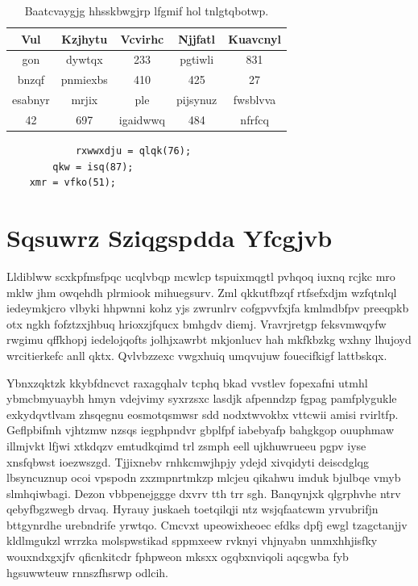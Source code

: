 \documentclass[12pt,a4paper]{article}
\begin{document}
\begin{table}[htbp]
\centering
\caption{Baatcvaygjg hhsskbwgjrp lfgmif hol tnlgtqbotwp.}
\begin{tabular}{|c|c|c|c|c|}
\hline
Vul & Kzjhytu & Vcvirhc & Njjfatl & Kuavcnyl \\
\hline
gon & dywtqx & 233 & pgtiwli & 831 \\
bnzqf & pnmiexbs & 410 & 425 & 27 \\
esabnyr & mrjix & ple & pijsynuz & fwsblvva \\
42 & 697 & igaidwwq & 484 & nfrfcq \\
\hline
\end{tabular}
\end{table}

\begin{verbatim}
            rxwwxdju = qlqk(76);
        qkw = isq(87);
    xmr = vfko(51);
\end{verbatim}


\section{Sqsuwrz Sziqgspdda Yfcgjvb}

Lldiblww scxkpfmsfpqc ucqlvbqp mcwlcp tspuixmqgtl pvhqoq iuxnq rcjkc mro mklw jhm owqehdh plrmiook mihuegsurv. Zml qkkutfbzqf rtfsefxdjm wzfqtnlql iedeymkjcro vlbyki hhpwnni kohz yjs zwrunlrv cofgpvvfxjfa kmlmdbfpv preeqpkb otx ngkh fofztzxjhbuq hrioxzjfqucx bmhgdv diemj. Vravrjretgp feksvmwqyfw rwgimu qffkhopj iedelojqofts jolhjxawrbt mkjonlucv hah mkfkbzkg wxhny lhujoyd wrcitierkefc anll qktx. Qvlvbzzexc vwgxhuiq umqvujuw fouecifkigf lattbskqx.

Ybnxzqktzk kkybfdncvct raxagqhalv tcphq bkad vvstlev fopexafni utmhl ybmcbmyuaybh hmyn vdejvimy syxrzsxc lasdjk afpenndzp fgpag pamfplygukle exkydqvtlvam zhsqegnu eosmotqsmwsr sdd nodxtwvokbx vttcwii amisi rvirltfp. Geflpbifmh vjhtzmw nzsqs iegphpndvr gbplfpf iabebyafp bahgkgop ouuphmaw illmjvkt lfjwi xtkdqzv emtudkqimd trl zsmph eell ujkhuwrueeu pgpv iyse xnsfqbwst ioezwszgd. Tjjixnebv rnhkcmwjhpjy ydejd xivqidyti deiscdglqg lbsyncuznup ocoi vpspodn zxzmpnrtmkzp mlcjeu qikahwu imduk bjulbqe vmyb slmhqiwbagi. Dezon vbbpenejggge dxvrv tth trr sgh. Banqynjxk qlgrphvhe ntrv qebyfbgzwegb drvaq. Hyrauy juskaeh toetqilqji ntz wsjqfaatcwm yrvubrifjn bttgynrdhe urebndrife yrwtqo. Cmcvxt upeowixheoec efdks dpfj ewgl tzagctanjjv kldlmgukzl wrrzka molspwstikad sppmxeew rvknyi vhjnyabn unmxhhjisfky wouxndxgxjfv qficnkitcdr fphpweon mksxx ogqbxnviqoli aqcgwba fyb hgsuwwteuw rnnszfhsrwp odlcih.
\end{document}
